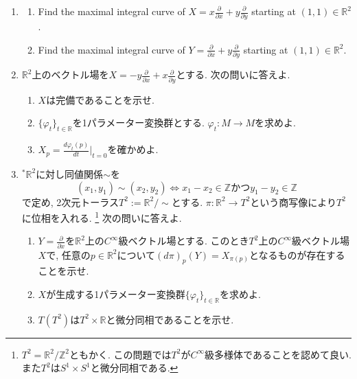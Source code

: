 \documentclass[dvipdfmx,a4paper,11pt]{article}
\newcommand{\R}{\mathbb{R}}
\newcommand{\Z}{\mathbb{Z}}
\theoremstyle{definition}
\newcommand{\pdrv}[2]{\frac{\partial #1}{\partial #2}}
\newcommand{\drv}[2]{\frac{d #1}{d#2}}
\begin{document}
\begin{enumerate}[label=\textbf{問}2.\arabic*]
\item 
\begin{enumerate}
\item Find the maximal integral curve of $X=x\pdrv{}{x} + y \pdrv{}{y}$ starting at $(1,1) \in \R^2$.
\item Find the maximal integral curve of $Y=\pdrv{}{x} + y \pdrv{}{y}$ starting at $(1,1) \in \R^2$.
\end{enumerate}
\item $\R^{2}$上のベクトル場を$X = -y \pdrv{}{x} + x \pdrv{}{y}$とする. 次の問いに答えよ.
\begin{enumerate}
\item $X$は完備であることを示せ.%
\item $\{ \varphi_{t} \}_{t \in \R}$を1パラメーター変換群とする. $ \varphi_{t}: M \rightarrow M$を求めよ. 
\item $X_{p} =  \drv{\varphi_{t}(p)}{t}\Bigr|_{t=0} $を確かめよ.
\end{enumerate}

\item \label{torus} $^{*}$$\R^{2}$に対し同値関係$\sim$を
$$
(x_1, y_1)\sim (x_2, y_2) \Leftrightarrow x_1 - x_2 \in \Z \text{かつ} y_1 - y_2 \in \Z 
$$
で定め, 2次元トーラス$T^2 := \R^2/\sim$とする. $\pi : \R^2 \rightarrow T^2$という商写像により$T^2$に位相を入れる. \footnote{$T^2 = \R^2/\Z^2$ともかく. この問題では$T^2$が$C^{\infty}$級多様体であることを認めて良い. また$T^2$は$S^{1} \times S^{1}$と微分同相である. } 
次の問いに答えよ.
\begin{enumerate}
\item $Y=\pdrv{}{x}$を$\R^2$上の$C^{\infty}$級ベクトル場とする. このとき$T^2$上の$C^{\infty}$級ベクトル場$X$で, 任意の$p \in \R^2$について$(d \pi)_{p} (Y)= X_{\pi(p)}$となるものが存在することを示せ.
\item $X$が生成する1パラメーター変換群$\{ \varphi_{t} \}_{t \in \R}$を求めよ.
\item  $T(T^{2})$は$ T^{2} \times \R$と微分同相であることを示せ. 
\end{enumerate}




\end{enumerate}
\end{document}
